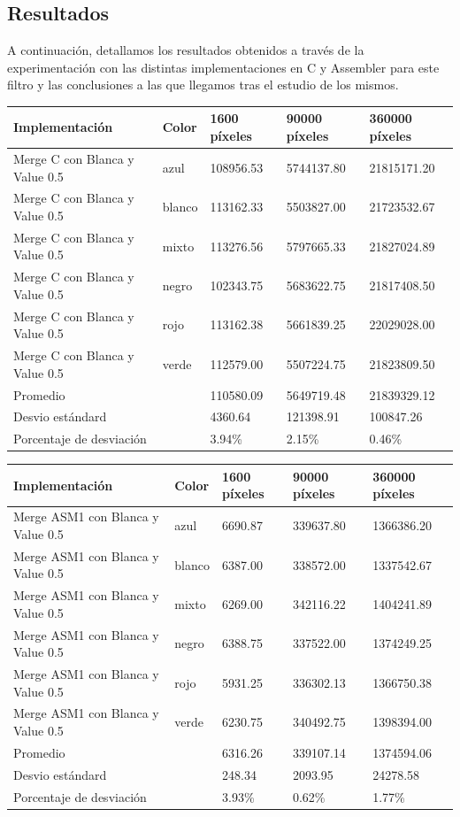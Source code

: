 \subsection{Resultados}
A continuación, detallamos los resultados obtenidos a través de la experimentación con las distintas implementaciones en C y Assembler para este filtro y las conclusiones a las que llegamos tras el estudio de los mismos.


\begin{tabular}{| l | l | l | l | l |}
\hline
Implementación & Color & 1600 píxeles & 90000 píxeles & 360000 píxeles\\
\hline
Merge C con Blanca y Value 0.5 & azul & 108956.53 &	5744137.80	& 21815171.20\\ 
\hline
Merge C con Blanca y Value 0.5 & blanco & 113162.33	& 5503827.00	& 21723532.67\\ 
\hline
Merge C con Blanca y Value 0.5 & mixto & 113276.56	& 5797665.33	& 21827024.89\\ 
\hline
Merge C con Blanca y Value 0.5 & negro & 102343.75	& 5683622.75 &	21817408.50\\
\hline
Merge C con Blanca y Value 0.5 & rojo & 113162.38	& 5661839.25	& 22029028.00\\
\hline
Merge C con Blanca y Value 0.5 & verde & 112579.00	& 5507224.75	& 21823809.50\\ 
\hline
Promedio & &  110580.09	& 5649719.48	& 21839329.12\\
\hline
Desvio estándard  && 4360.64	& 121398.91	& 100847.26\\
\hline
Porcentaje de desviación  && 3.94\%	& 2.15\%	& 0.46\%\\
\hline
\end{tabular}

\begin{tabular}{| l | l | l | l | l |}
\hline
Implementación & Color & 1600 píxeles & 90000 píxeles & 360000 píxeles\\
\hline
Merge ASM1 con Blanca y Value 0.5 & azul & 6690.87	& 339637.80	& 1366386.20\\ 
\hline
Merge ASM1 con Blanca y Value 0.5 & blanco & 6387.00	& 338572.00	& 1337542.67\\ 
\hline
Merge ASM1 con Blanca y Value 0.5 & mixto & 6269.00	& 342116.22 & 	1404241.89\\ 
\hline
Merge ASM1 con Blanca y Value 0.5 & negro & 6388.75 & 337522.00 & 	1374249.25\\
\hline
Merge ASM1 con Blanca y Value 0.5 & rojo & 5931.25	& 336302.13 & 	1366750.38\\
\hline
Merge ASM1 con Blanca y Value 0.5 & verde & 6230.75	& 340492.75	& 1398394.00\\ 
\hline
Promedio & &  6316.26 & 	339107.14 & 	1374594.06\\
\hline
Desvio estándard  && 248.34	& 2093.95	& 24278.58\\
\hline
Porcentaje de desviación  && 3.93\%	& 0.62\% &	1.77\%\\
\hline
\end{tabular}

